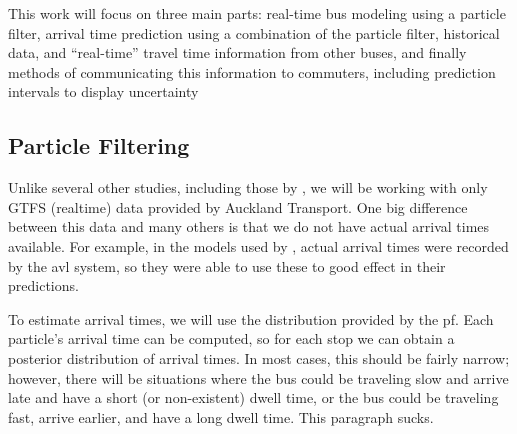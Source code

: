 \documentclass[12pt,a4paper]{article}
\begin{document}















This work will focus on three main parts:
real-time bus modeling using a particle filter,
arrival time prediction using a combination of the particle filter,
historical data, and ``real-time'' travel time information
from other buses,
and finally methods of communicating this information to commuters,
including prediction intervals
to display uncertainty


\subsection{Particle Filtering}
\label{sec:new-pf}

Unlike several other studies, including those by \cite{hans-etal:2015},
we will be working with only GTFS (realtime) data provided by Auckland Transport.
One big difference between this data and many others is that we do not have
actual arrival times available.
For example, in the models used by \cite{hans-etal:2015},
actual arrival times were recorded by the \gls{avl} system, 
so they were able to use these to good effect in their predictions.


To estimate arrival times, we will use the distribution provided by the \gls{pf}.
Each particle's arrival time can be computed, so for each stop we can obtain 
a posterior distribution of arrival times.
In most cases, this should be fairly narrow;
however, there will be situations where the bus could be traveling slow and arrive
late and have a short (or non-existent) dwell time,
or the bus could be traveling fast, arrive earlier,
and have a long dwell time.
This paragraph sucks.
\end{document}
